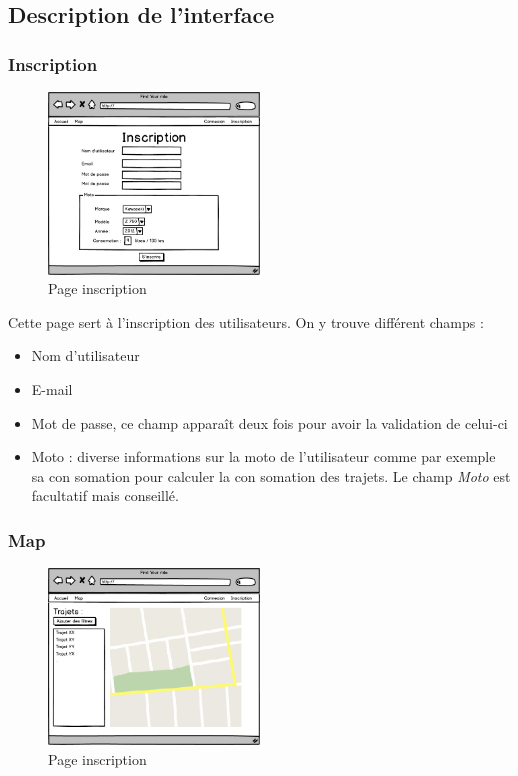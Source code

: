 \documentclass[a4paper]{article}
\begin{document}
\newpage

\subsection{Description de l'interface}

\subsubsection{Inscription}
\begin{figure}[h]
\centering
\includegraphics[width=0.5\textwidth]{./Images/Interfaces/inscription.png}
\caption{Page inscription}
\end{figure}

Cette page sert à l'inscription des utilisateurs. On y trouve différent champs : 
\begin{itemize}
    \item Nom d'utilisateur
    \item E-mail
    \item Mot de passe, ce champ apparaît deux fois pour avoir la validation de celui-ci
    \item Moto : diverse informations sur la moto de l'utilisateur comme par exemple sa con somation pour calculer la con somation des trajets. Le champ \emph{Moto} est facultatif mais conseillé.
\end{itemize}

\subsubsection{Map}
\begin{figure}[h]
\centering
\includegraphics[width=0.5\textwidth]{./Images/Interfaces/Map.png}
\caption{Page inscription}
\end{figure}
\end{document}
